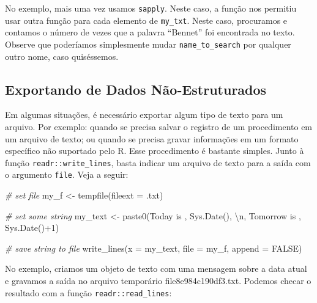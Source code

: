 \documentclass[
  11pt,
]{book}
\newenvironment{Shaded}{\begin{snugshade}}{\end{snugshade}}
\newcommand{\AttributeTok}[1]{\textcolor[rgb]{0.61,0.61,0.61}{#1}}
\newcommand{\CommentTok}[1]{\textcolor[rgb]{0.37,0.37,0.37}{\textit{#1}}}
\newcommand{\ConstantTok}[1]{\textcolor[rgb]{0,0,0}{#1}}
\newcommand{\DecValTok}[1]{\textcolor[rgb]{0.06,0.06,0.06}{#1}}
\newcommand{\FunctionTok}[1]{\textcolor[rgb]{0,0,0}{#1}}
\newcommand{\NormalTok}[1]{#1}
\newcommand{\OtherTok}[1]{\textcolor[rgb]{0.37,0.37,0.37}{#1}}
\newcommand{\SpecialCharTok}[1]{\textcolor[rgb]{0,0,0}{#1}}
\newcommand{\StringTok}[1]{\textcolor[rgb]{0.5,0.5,0.5}{#1}}
\begin{document}
No exemplo, mais uma vez usamos \texttt{sapply}. Neste caso, a função nos permitiu usar outra função para cada elemento de \texttt{my\_txt}. Neste caso, procuramos e contamos o número de vezes que a palavra ``Bennet'' foi encontrada no texto. Observe que poderíamos simplesmente mudar \texttt{name\_to\_search} por qualquer outro nome, caso quiséssemos.

\hypertarget{exportando-de-dados-nuxe3o-estruturados}{%
\subsection{Exportando de Dados Não-Estruturados}\label{exportando-de-dados-nuxe3o-estruturados}}

Em algumas situações, é necessário exportar algum tipo de texto para um arquivo. Por exemplo: quando se precisa salvar o registro de um procedimento em um arquivo de texto; ou quando se precisa gravar informações em um formato específico não suportado pelo R. Esse procedimento é bastante simples. Junto à função \texttt{readr::write\_lines}, basta indicar um arquivo de texto para a saída com o argumento \texttt{file}. Veja a seguir:

\begin{Shaded}
\begin{Highlighting}[]
\CommentTok{\# set file}
\NormalTok{my\_f }\OtherTok{\textless{}{-}} \FunctionTok{tempfile}\NormalTok{(}\AttributeTok{fileext =} \StringTok{\textquotesingle{}.txt\textquotesingle{}}\NormalTok{)}

\CommentTok{\# set some string}
\NormalTok{my\_text }\OtherTok{\textless{}{-}} \FunctionTok{paste0}\NormalTok{(}\StringTok{\textquotesingle{}Today is \textquotesingle{}}\NormalTok{, }\FunctionTok{Sys.Date}\NormalTok{(), }\StringTok{\textquotesingle{}}\SpecialCharTok{\textbackslash{}n}\StringTok{\textquotesingle{}}\NormalTok{, }
                  \StringTok{\textquotesingle{}Tomorrow is \textquotesingle{}}\NormalTok{, }\FunctionTok{Sys.Date}\NormalTok{()}\SpecialCharTok{+}\DecValTok{1}\NormalTok{)}

\CommentTok{\# save string to file}
\FunctionTok{write\_lines}\NormalTok{(}\AttributeTok{x =}\NormalTok{ my\_text, }\AttributeTok{file =}\NormalTok{ my\_f, }\AttributeTok{append =} \ConstantTok{FALSE}\NormalTok{)}
\end{Highlighting}
\end{Shaded}

No exemplo, criamos um objeto de texto com uma mensagem sobre a data atual e gravamos a saída no arquivo temporário file8e984c190df3.txt. Podemos checar o resultado com a função \texttt{readr::read\_lines}:
\end{document}
